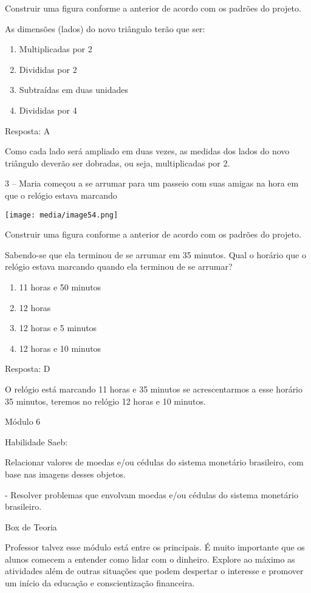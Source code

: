 Construir uma figura conforme a anterior de acordo com os padrões do
projeto.

As dimensões (lados) do novo triângulo terão que ser:

\begin{enumerate}
\def\labelenumi{\alph{enumi})}
\item
  Multiplicadas por 2
\item
  Divididas por 2
\item
  Subtraídas em duas unidades
\item
  Divididas por 4
\end{enumerate}

Resposta: A

Como cada lado será ampliado em duas vezes, as medidas dos lados do novo
triângulo deverão ser dobradas, ou seja, multiplicadas por 2.

3 -- Maria começou a se arrumar para um passeio com suas amigas na hora
em que o relógio estava marcando

\texttt{[image: media/image54.png]}

Construir uma figura conforme a anterior de acordo com os padrões do
projeto.

Sabendo-se que ela terminou de se arrumar em 35 minutos. Qual o horário
que o relógio estava marcando quando ela terminou de se arrumar?

\begin{enumerate}
\def\labelenumi{\alph{enumi})}
\item
  11 horas e 50 minutos
\item
  12 horas
\item
  12 horas e 5 minutos
\item
  12 horas e 10 minutos
\end{enumerate}

Resposta: D

O relógio está marcando 11 horas e 35 minutos se acrescentarmos a esse
horário 35 minutos, teremos no relógio 12 horas e 10 minutos.

Módulo 6

Habilidade Saeb:

Relacionar valores de moedas e/ou cédulas do sistema monetário
brasileiro, com base nas imagens desses objetos.

- Resolver problemas que envolvam moedas e/ou cédulas do sistema
monetário brasileiro.

Box de Teoria

Professor talvez esse módulo está entre os principais. É muito
importante que os alunos comecem a entender como lidar com o dinheiro.
Explore ao máximo as atividades além de outras situações que podem
despertar o interesse e promover um início da educação e conscientização
financeira.

